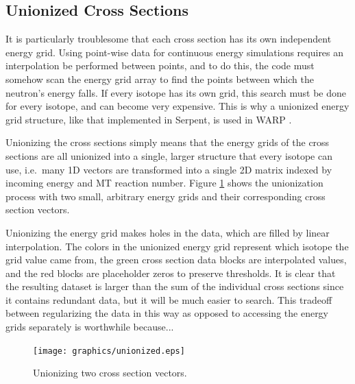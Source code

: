 \subsection{Unionized Cross Sections}

It is particularly troublesome that each cross section has its own independent energy grid.  Using point-wise data for continuous energy simulations requires an interpolation be performed between points, and to do this, the code must somehow scan the energy grid array to find the points between which the neutron's energy falls.  If every isotope has its own grid, this search must be done for every isotope, and can become very expensive.  This is why a unionized energy grid structure, like that implemented in Serpent, is used in WARP \cite{jaakko_xs}.

Unionizing the cross sections simply means that the energy grids of the cross sections are all unionized into a single, larger structure that every isotope can use, i.e.\ many 1D vectors are transformed into a single 2D matrix indexed by incoming energy and MT reaction number. %
 Figure \ref{unionized_layout} shows the unionization process with two small, arbitrary energy grids and their corresponding cross section vectors.  

Unionizing the energy grid makes holes in the data, %
which are filled by linear interpolation. The colors in the unionized energy grid represent which isotope the grid value came from, the green cross section data blocks are interpolated values, and the red blocks are placeholder zeros to preserve thresholds. It is clear that the resulting dataset is larger than the sum of the individual cross sections since it contains redundant data, but it will be much easier to search.%
  This tradeoff between regularizing the data in this way as opposed to accessing the energy grids separately is worthwhile because...  
  
\begin{figure}[h!] 
\centering
\texttt{[image: graphics/unionized.eps]}
\caption{Unionizing two cross section vectors. \label{unionized_layout} }
\end{figure}

